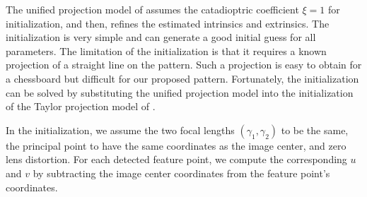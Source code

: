 \documentclass{report}
\begin{document}
The unified projection model of \cite{mei2007single} assumes the catadioptric coefficient $\xi = 1$ for initialization, and then, refines the estimated intrinsics and extrinsics. The initialization is very simple and can generate a good initial guess for all parameters. The limitation of the initialization is that it requires a known projection of a straight line on the pattern. Such a projection is easy to obtain for a chessboard but difficult for our proposed pattern. Fortunately, the initialization can be solved by substituting the unified projection model into the initialization of the Taylor projection model of \cite{scaramuzza2006toolbox}.

In the initialization, we assume the two focal lengths $(\gamma_1, \gamma_2)$ to be the same, the principal point to have the same coordinates as the image center, and zero lens distortion. For each detected feature point, we compute the corresponding $u$ and $v$ by subtracting the image center coordinates from the feature point's coordinates.
\end{document}
